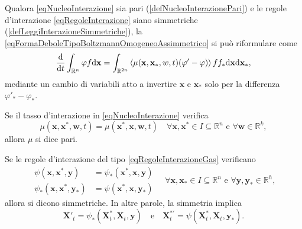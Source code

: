                 \begin{oss}
                    Qualora \ref{eqNucleoInterazione} sia pari (\cref{defNucleoInterazionePari}) e le regole d'interazione \ref{eqRegoleInterazione} siano simmetriche (\cref{defLeggiInterazioneSimmetriche}), la \ref{eqFormaDeboleTipoBoltzmannOmogeneoAssimmetrico} si può riformulare come
                    \begin{equation}
                        \label{eqFormaDeboleTipoBoltzmannOmogeneoSimmetrico}
                        \frac{\mathrm{d}}{\mathrm{d}t}\int_{\mathbb R^n}\varphi f\mathrm{d}\mathbf x=
                        \int_{\mathbb R^{2n}}\left\langle
                                \mu(\mathbf x,\mathbf x_*,w,t)(\varphi'-\varphi)
                            \right\rangle
                        ff_*\mathrm{d}\mathbf x\mathrm{d}\mathbf x_*,
                    \end{equation}
                    mediante un cambio di variabili atto a invertire \(\mathbf x\) e \(\mathbf x_*\) solo per la differenza \(\varphi'_*-\varphi_*\).
                \end{oss}

                \begin{dfn}
                    \label{defNucleoInterazionePari}
                    Se il tasso d'interazione in \ref{eqNucleoInterazione} verifica
                    \[
                        \mu(\mathbf x,\mathbf x^*,\mathbf w,t)=\mu(\mathbf x^*,\mathbf x,\mathbf w,t)
                        \quad\forall\mathbf x,\mathbf x^*\in I\subseteq\mathbb R^n
                        \text{ e }\forall\mathbf w\in\mathbb R^k,
                    \]
                    allora \(\mu\) si dice pari.
                \end{dfn}

                \begin{dfn}
                    \label{defLeggiInterazioneSimmetriche}
                    Se le regole d'interazione del tipo \ref{eqRegoleInterazioneGas} verificano
                    \[
                        \begin{aligned}
                            \psi(\mathbf x,\mathbf x^*,\mathbf y)&=\psi_*(\mathbf x^*,\mathbf x,\mathbf y)\\
                            \psi_*(\mathbf x,\mathbf x^*,\mathbf y_*)&=\psi(\mathbf x^*,\mathbf x,\mathbf y_*)
                        \end{aligned}
                        \quad\forall\mathbf x,\mathbf x_*\in I\subseteq\mathbb R^n
                        \text{ e }\forall\mathbf y,\mathbf y_*\in\mathbb R^h,
                    \]
                    allora si dicono simmetriche. In altre parole, la simmetria implica
                    \[
                        \mathbf X'_t=\psi_*(\mathbf X^*_t,\mathbf X_t,\mathbf y)
                        \quad\text{e}\quad
                        \mathbf X^{*\prime}_t=\psi(\mathbf X^*_t,\mathbf X_t,\mathbf y_*).
                    \]
                \end{dfn}

